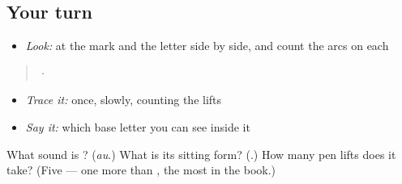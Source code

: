 \subsection*{Your turn}
\begin{itemize}
\raggedright
  \item \emph{Look:} at the mark and the letter side by side, and count the arcs on each
\end{itemize}

\begin{quote}
  ·  
\end{quote}

\begin{itemize}
\raggedright
  \item \emph{Trace it:}  once, slowly, counting the lifts
  \item \emph{Say it:} which base letter you can see inside it
\end{itemize}

\begin{tcolorbox}[breakable,colback=teal!4,colframe=teal!35!black,title={Before you move on}]
What sound is \textbf{}? (\emph{au}.) What is its sitting form? (\textbf{}.) How many pen lifts does it take? (Five — one more than \textbf{}, the most in the book.)
\end{tcolorbox}
